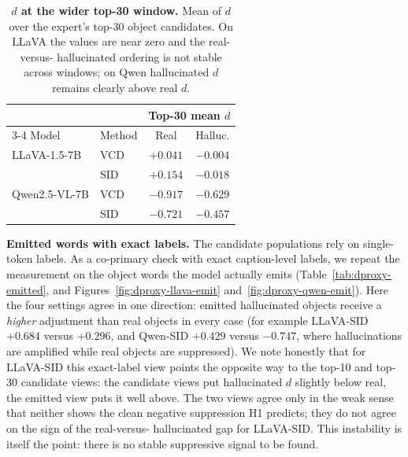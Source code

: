\documentclass{article}
\begin{document}
\begin{table}[t]
\centering
\small
\setlength{\tabcolsep}{5pt}
\caption{\textbf{$d$ at the wider top-30 window.} Mean of $d$ over the expert's
top-30 object candidates. On LLaVA the values are near zero and the real-versus-
hallucinated ordering is not stable across windows; on Qwen hallucinated $d$
remains clearly above real $d$.}
\label{tab:dproxy-robust}
\begin{tabular}{ll cc}
\toprule
& & \multicolumn{2}{c}{Top-30 mean $d$} \\
\cmidrule(lr){3-4}
Model & Method & Real & Halluc. \\
\midrule
LLaVA-1.5-7B & VCD & $+0.041$ & $-0.004$ \\
 & SID & $+0.154$ & $-0.018$ \\
Qwen2.5-VL-7B & VCD & $-0.917$ & $-0.629$ \\
 & SID & $-0.721$ & $-0.457$ \\
\bottomrule
\end{tabular}
\end{table}

\textbf{Emitted words with exact labels.} The candidate populations rely on
single-token labels. As a co-primary check with exact caption-level labels, we
repeat the measurement on the object words the model actually emits
(Table~\ref{tab:dproxy-emitted}, and Figures~\ref{fig:dproxy-llava-emit}
and~\ref{fig:dproxy-qwen-emit}). Here the four settings agree in one direction:
emitted hallucinated objects receive a \emph{higher} adjustment than real objects
in every case (for example LLaVA-SID $+0.684$ versus $+0.296$, and Qwen-SID
$+0.429$ versus $-0.747$, where hallucinations are amplified while real objects
are suppressed). We note honestly that for LLaVA-SID this exact-label view points
the opposite way to the top-10 and top-30 candidate views: the candidate views
put hallucinated $d$ slightly below real, the emitted view puts it well above.
The two views agree only in the weak sense that neither shows the clean negative
suppression H1 predicts; they do not agree on the sign of the real-versus-
hallucinated gap for LLaVA-SID. This instability is itself the point: there is no
stable suppressive signal to be found.
\end{document}

